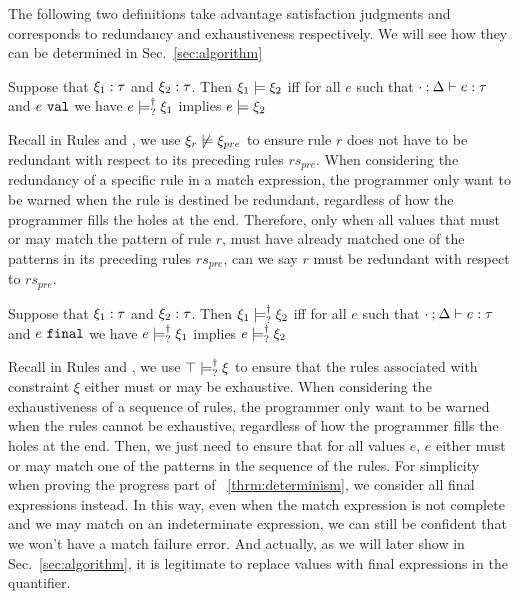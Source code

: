 \documentclass[runningheads,envcountsame,a4paper]{llncs}
\begin{document}
The following two definitions take advantage satisfaction judgments and
corresponds to redundancy and exhaustiveness respectively. We will see how they
can be determined in Sec.~\ref{sec:algorithm}

\begin{definition}
  \label{defn:const-entailment}
  Suppose that $\xi_1 : \tau$ and $\xi_2 : \tau$.
  Then $\xi_1 \models \xi_2$ iff for all $e$ such that $\cdot \mathbin{;} \Delta \vdash e : \tau$ and $e ~\mathtt{val}$ we have $e \models_{?}^{\dag} \xi_1$ implies $e \models \xi_2$
\end{definition}

Recall in Rules \TOneRules and \TRules, we use $\xi_r \not\models \xi_{pre}$ to ensure rule $r$ does not have to be redundant with respect to its preceding rules $rs_{pre}$. When considering the redundancy of a specific rule in a match expression, the programmer only want to be warned when the rule is destined be redundant, regardless of how the programmer fills the holes at the end. Therefore, only when all values that must or may match the pattern of rule $r$, must have already matched one of the patterns in its preceding rules $rs_{pre}$, can we say $r$ must be redundant with respect to $rs_{pre}$.

\begin{definition}
  \label{defn:nn-entailment}
  Suppose that $\xi_1 : \tau$ and $\xi_2 : \tau$. Then $\xi_1 \models_{?}^{\dag} \xi_2$ iff for all $e$ such that $\cdot \mathbin{;} \Delta \vdash e : \tau$ and $e ~\mathtt{final}$ we have $e \models_{?}^{\dag} \xi_1$ implies $e \models_{?}^{\dag} \xi_2$ 
\end{definition}

Recall in Rules \TMatchZPre and \TMatchNZPre, we use $\top \models_{?}^{\dag} \xi$ to ensure that the rules associated with constraint $\xi$ either must or may be exhaustive. When considering the exhaustiveness of a sequence of rules, the programmer only want to be warned when the rules cannot be exhaustive, regardless of how the programmer fills the holes at the end. Then, we just need to ensure that for all values $e$, $e$ either must or may match one of the patterns in the sequence of the rules. For simplicity when proving the progress part of  \theoremname~\ref{thrm:determinism}, we consider all final expressions instead. In this way, even when the match expression is not complete and we may match on an indeterminate expression, we can still be confident that we won't have a match failure error. And actually, as we will later show in Sec.~\ref{sec:algorithm}, it is legitimate to replace values with final expressions in the quantifier.
\end{document}
